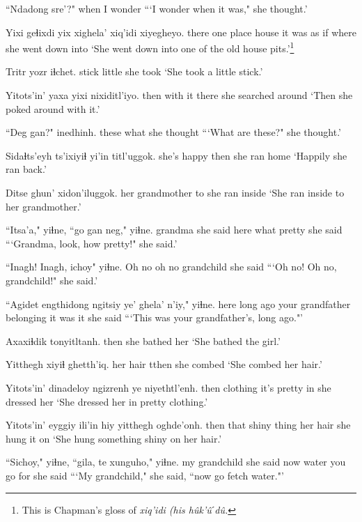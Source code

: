 \documentclass[12pt]{article}
\begin{document}
\gll ``Ndadong sre'?"
when {I wonder}
\glt ```I wonder when it was," she thought.'
\glend

\gll Yixi geɬixdi yix xighela' xiq'idi xiyegheyo.
there {one place} house {it was} {as if where} {she went down into}
\glt `She went down into one of the old house pits.'\footnote{This is Chapman's gloss of \em xiq'idi \em (his \em h\^uk'\^uˊd\^u.}
\glend

\gll Tritr yozr iɬchet. 
stick little {she took} 
\glt `She took a little stick.'
\glend

\gll Yitots'in' yaxa yixi nixiditl'iyo.
then {with it} there {she searched around}
\glt `Then she poked around with it.'
\glend

\gll ``Deg gan?" inedhinh.
these what {she thought}
\glt ```What are these?" she thought.'
\glend

\gll Sidaɬts'eyh ts'ixiyiɬ {yi'in titl'uggok.}
{she's happy} then  {she ran home}
\glt `Happily she ran back.'
\glend

\gll Ditse ghun' xidon'iluggok.
{her grandmother} to {she ran inside}
\glt `She ran inside to her grandmother.'
\glend
 
\gll ``Itsa'a," yiɬne, ``go gan neg," yiɬne.
grandma {she said} here what pretty {she said}
\glt ```Grandma, look, how pretty!" she said.'
\glend

\gll ``Inagh! Inagh, ichoy" yiɬne.
{Oh no} {oh no} grandchild {she said}
\glt ```Oh no! Oh no, grandchild!" she said.'
\glend

\gll ``Agidet engthidong ngitsiy ye' ghela' n'iy," yiɬne.
here {long ago} {your grandfather} belonging {it was} it {she said}
\glt ```This was your grandfather's, long ago."'
\glend

\gll Axaxiɬdik tonyitltanh.
then {she bathed her}
\glt `She bathed the girl.'
\glend

\gll Yitthegh xiyiɬ ghetth'iq.
{her hair} tthen {she combed }
\glt `She combed her hair.'
\glend

\gll Yitots'in' dinadeloy ngizrenh ye niyethtl'enh.
then clothing {it's pretty} in {she dressed her}
\glt `She dressed her in pretty clothing.'
\glend

\gll Yitots'in' eyggiy {ili'in hiy} yitthegh oghde'onh.
then that {shiny thing} {her hair} {she hung it on}
\glt `She hung something shiny on her hair.'
\glend

\gll ``Sichoy," yiɬne, ``gila, te xunguho," yiɬne.
{my grandchild} {she said} now water {you go for} {she said}
\glt ```My grandchild," she said, ``now go fetch water."'
\glend
\end{document}
